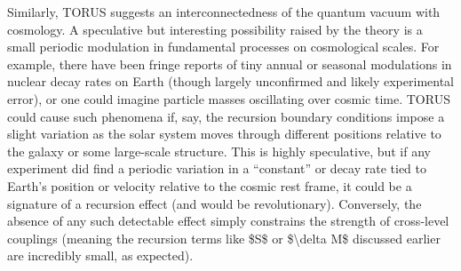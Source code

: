 \documentclass[]{article}
\begin{document}
Similarly, TORUS suggests an interconnectedness of the quantum vacuum
with cosmology. A speculative but interesting possibility raised by the
theory is a small periodic modulation in fundamental processes on
cosmological scales. For example, there have been fringe reports of tiny
annual or seasonal modulations in nuclear decay rates on Earth (though
largely unconfirmed and likely experimental error), or one could imagine
particle masses oscillating over cosmic time. TORUS could cause such
phenomena if, say, the recursion boundary conditions impose a slight
variation as the solar system moves through different positions relative
to the galaxy or some large-scale structure. This is highly speculative,
but if any experiment did find a periodic variation in a ``constant'' or
decay rate tied to Earth's position or velocity relative to the cosmic
rest frame, it could be a signature of a recursion effect (and would be
revolutionary). Conversely, the absence of any such detectable effect
simply constrains the strength of cross-level couplings (meaning the
recursion terms like \$S\$ or \$\textbackslash{}delta M\$ discussed
earlier are incredibly small, as expected).
\end{document}

